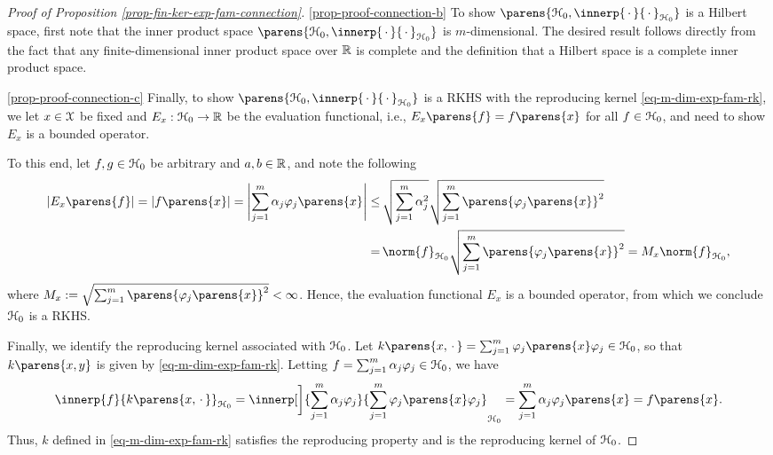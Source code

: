 \begin{proof}[Proof of Proposition \ref{prop-fin-ker-exp-fam-connection}]
	\ref{prop-proof-connection-b} To show $\parens{\calH_0, \innerp{\,\cdot\,}{\,\cdot\,}_{\calH_0}}$ is a Hilbert space, first note that the inner product space $\parens{\calH_0, \innerp{\,\cdot\,}{\,\cdot\,}_{\calH_0}}$ is $m$-dimensional. The desired result follows directly from the fact that any finite-dimensional inner product space over $\mathbb{R}$ is complete and the definition that a Hilbert space is a complete inner product space. 
	
	\ref{prop-proof-connection-c} Finally, to show $\parens{\calH_0, \innerp{\,\cdot\,}{\,\cdot\,}_{\calH_0}}$ is a RKHS with the reproducing kernel \eqref{eq-m-dim-exp-fam-rk}, we let $x \in \mathcal{X}$ be fixed and $E_x: \mathcal{H}_0 \to \mathbb{R}$ be the evaluation functional, i.e., $E_x \parens{f} = f \parens{x}$ for all $f \in \mathcal{H}_0$, and need to show $E_x$ is a bounded operator. 
	
	To this end, let $f, g \in \mathcal{H}_0$ be arbitrary and $a, b \in \mathbb{R}$, and note the following 
	\begin{align*}
		\abs{E_x \parens{f}} = \abs{f \parens{x}} = \abs[\Bigg]{\sum_{j=1}^m \alpha_j \varphi_j \parens{x}} 
		\le & \, \sqrt{\sum_{j=1}^m \alpha_j^2} \sqrt{\sum_{j=1}^m \parens{\varphi_j \parens{x}}^2} \\ 
		= & \, \norm{f}_{\calH_0} \sqrt{\sum_{j=1}^m \parens{\varphi_j \parens{x}}^2} 
		= M_x \norm{f}_{\calH_0}, 
	\end{align*}
	where $M_x := \sqrt{\sum_{j=1}^m \parens{\varphi_j \parens{x}}^2} < \infty$. Hence, the evaluation functional $E_x$ is a bounded operator, from which we conclude $\mathcal{H}_0$ is a RKHS. 
	
	Finally, we identify the reproducing kernel associated with $\mathcal{H}_0$. Let $k \parens{x, \,\cdot\,} = \sum_{j=1}^m \varphi_j \parens{x} \varphi_j \in \calH_0$, 
	so that $k \parens{x, y}$ is given by \eqref{eq-m-dim-exp-fam-rk}. Letting $f = \sum_{j=1}^m \alpha_j \varphi_j \in \mathcal{H}_0$, we have 
	\begin{align*}
		\innerp{f}{k \parens{x, \,\cdot\,}}_{\calH_0} = \innerp[\bigg]{\sum_{j=1}^m \alpha_j \varphi_j}{\sum_{j=1}^m \varphi_j \parens{x} \varphi_j}_{\calH_0} = \sum_{j=1}^m \alpha_j \varphi_j \parens{x} = f \parens{x}. 
	\end{align*}
	Thus, $k$ defined in \eqref{eq-m-dim-exp-fam-rk} satisfies the reproducing property and is the reproducing kernel of $\mathcal{H}_0$. 
\end{proof}



